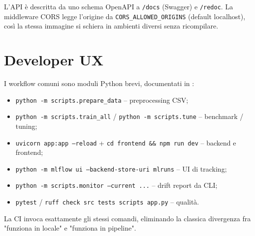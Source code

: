 L'API è descritta da uno schema OpenAPI a \texttt{/docs} (Swagger) e
\texttt{/redoc}. La middleware CORS legge l'origine da
\texttt{CORS\_ALLOWED\_ORIGINS} (default localhost), così la stessa
immagine si schiera in ambienti diversi senza ricompilare.

\section{Developer UX}

I workflow comuni sono moduli Python brevi, documentati in
:
\begin{itemize}
  \item \texttt{python -m scripts.prepare\_data} -- preprocessing CSV;
  \item \texttt{python -m scripts.train\_all} /
        \texttt{python -m scripts.tune} -- benchmark / tuning;
  \item \texttt{uvicorn app:app --reload} +
        \texttt{cd frontend \&\& npm run dev} -- backend e frontend;
  \item \texttt{python -m mlflow ui --backend-store-uri mlruns} -- UI di
        tracking;
  \item \texttt{python -m scripts.monitor --current ...} -- drift report
        da CLI;
  \item \texttt{pytest} / \texttt{ruff check src tests scripts app.py}
        -- qualità.
\end{itemize}

La CI invoca esattamente gli stessi comandi, eliminando la classica
divergenza fra "funziona in locale" e "funziona in pipeline".
